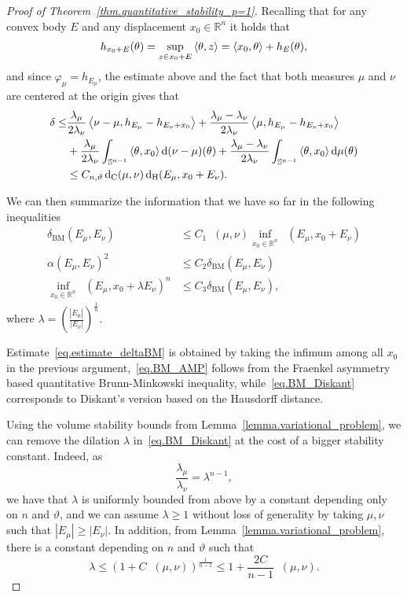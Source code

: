 \documentclass[a4paper, 10pt, twoside]{amsart}
\numberwithin{equation}{section}
\theoremstyle{plain}
\theoremstyle{definition}
\DeclareMathOperator{\BM}{\mathrm{BM}}
\DeclareMathOperator{\dc}{\mathrm{d}_\mathrm{C}}
\DeclareMathOperator{\dH}{\mathrm{d}_\mathrm{H}}
\begin{document}
\begin{proof}[Proof of Theorem~\ref{thm.quantitative_stability_p=1}]
    Recalling that for any convex body $E$ and any displacement $x_0 \in \mathbb{R}^n$ it holds that 
    \[
        h_{x_0+E}(\theta) 
        = 
        \mathop{\rm sup}_{z \in x_0 + E} \left\langle\theta,z\right\rangle 
        = 
        \left\langle x_0,\theta\right\rangle + h_E(\theta), 
    \]
    and since $\varphi_{\mu} = h_{E_\mu}$, the estimate above and the fact that both measures $\mu$ and $\nu$ are centered at the origin gives that 
   \begin{align*}
        \delta \le&
        \frac{\lambda_\mu}{2\lambda_\nu} 
        \inner{\nu - \mu, h_{E_\mu}- h_{E_\nu + x_0}}
        + 
        \frac{\lambda_\mu - \lambda_\nu}{2\lambda_\nu} 
        \inner{\mu,  h_{E_\mu}- h_{E_\nu + x_0}} \\
        &+ 
        \frac{\lambda_\mu}{2\lambda_\nu} 
        \int_{\mathbb{S}^{n-1}}
        \inner{\theta, x_0}\dd(\nu - \mu)(\theta)
        +
        \frac{\lambda_\mu - \lambda_\nu}{2\lambda_\nu} 
        \int_{\mathbb{S}^{n-1}}
        \inner{\theta,x_0} \dd \mu (\theta)\\ 
        &\le 
        C_{n,\vartheta} \dc(\mu,\nu) \dH(E_\mu, x_0 + E_\nu). 
   \end{align*}

   We can then summarize the information that we have so far in the following inequalities
   \begin{align}
        \label{eq.estimate_deltaBM}
        \delta_{\BM}(E_\mu,E_\nu) 
        &\le 
        C_1 \dc(\mu,\nu) \inf_{x_0 \in \mathbb{R}^n} \dH(E_\mu, x_0 + E_\nu)\\
        \label{eq.BM_AMP}
        \alpha(E_\mu,E_\nu)^2
        &\le 
        C_2 \delta_{\BM}(E_\mu,E_\nu) \\
        \label{eq.BM_Diskant}
        \inf_{x_0 \in \mathbb{R}^n} 
        \dH(E_\mu, x_0 + \lambda E_\nu)^n
        &\le 
        C_3 \delta_{\BM}(E_\mu,E_\nu),
   \end{align}  
   where $\lambda = \left(\frac{|E_\mu|}{|E_\nu|}\right)^{\frac{1}{n}}$.
   
   Estimate~\eqref{eq.estimate_deltaBM} is obtained by taking the infimum among all $x_0$ in the previous argument,~\eqref{eq.BM_AMP} follows from the Fraenkel asymmetry based quantitative Brunn-Minkowski inequality, while~\eqref{eq.BM_Diskant} corresponds to Diskant's version based on the Hausdorff distance.

   Using the volume stability bounds from Lemma~\ref{lemma.variational_problem}, we can remove the dilation $\lambda$ in~\eqref{eq.BM_Diskant} at the cost of a bigger stability constant. Indeed, as 
   \[
        \frac{\lambda_\mu}{\lambda_\nu} = \lambda^{n-1},
   \]
   we have that $\lambda$ is uniformly bounded from above by a constant depending only on $n$ and $\vartheta$, and we can assume $\lambda \ge 1$ without loss of generality by taking $\mu,\nu$ such that $|E_\mu| \ge |E_\nu|$. In addition, from Lemma~\ref{lemma.variational_problem}, there is a constant depending on $n$ and $\vartheta$ such that 
   \[
      \lambda \le 
      {\left(1 + C\dc(\mu,\nu)\right)}^{\frac{1}{n-1}} 
      \le
      1 + \frac{2C}{n-1}\dc(\mu,\nu). 
   \]
   

\end{proof}
\end{document}
